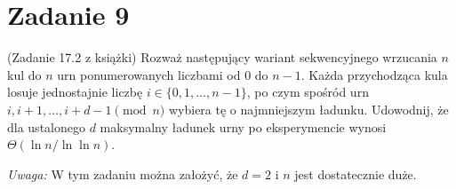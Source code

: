 \section[\nierozwiazane{Zadanie 9}]{Zadanie 9}
 (Zadanie 17.2 z książki) Rozważ następujący wariant sekwencyjnego wrzucania
\(n\) kul do \(n\) urn ponumerowanych liczbami od \(0\) do \(n - 1\). Każda przychodząca kula
losuje jednostajnie liczbę \(i \in \{0, 1, \ldots, n - 1\}\), po czym spośród urn \(i, i + 1, \ldots, i + d - 1 \pmod{n}\)
wybiera tę o najmniejszym ładunku. Udowodnij, że dla ustalonego \(d\) maksymalny
ładunek urny po eksperymencie wynosi \(\Theta(\ln n / \ln \ln n)\).

\textit{Uwaga:} W tym zadaniu można założyć, że \(d = 2\) i \(n\) jest dostatecznie duże.

\brakrozwiazania
